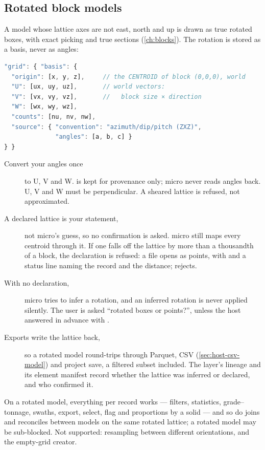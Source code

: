\subsection{Rotated block models}\label{sec:host-rotated}

A model whose lattice axes are not east, north and up is drawn as true rotated boxes, with exact
picking and true sections (\cref{ch:blocks}). The rotation is stored as a basis, never as angles:

\begin{lstlisting}[language=js]
"grid": { "basis": {
  "origin": [x, y, z],     // the CENTROID of block (0,0,0), world
  "U": [ux, uy, uz],       // world vectors:
  "V": [vx, vy, vz],       //   block size × direction
  "W": [wx, wy, wz],
  "counts": [nu, nv, nw],
  "source": { "convention": "azimuth/dip/pitch (ZXZ)",
              "angles": [a, b, c] }
} }
\end{lstlisting}

\begin{description}
\item[Convert your angles once] to U, V and W.  is kept for provenance only; micro
  never reads angles back. U, V and W must be perpendicular. A sheared lattice is refused, not
  approximated.
\item[A declared lattice is your statement,] not micro's guess, so no confirmation is asked. micro
  still maps every centroid through it. If one falls off the lattice by more than a thousandth of
  a block, the declaration is refused: a file opens as points, with
   and a status line naming the record and the distance;
   rejects.
\item[With no declaration,] micro tries to infer a rotation, and an inferred rotation is never
  applied silently. The user is asked “rotated boxes or points?”, unless the host answered in
  advance with .
\item[Exports write the lattice back,] so a rotated model round-trips through Parquet, CSV
  (\cref{sec:host-csv-model}) and project save, a filtered subset included. The layer's lineage
  and its element manifest record whether the lattice was inferred or declared, and who confirmed
  it.
\end{description}

\begin{note}
On a rotated model, everything per record works — filters, statistics, grade–tonnage, swaths,
export, select, flag and proportions by a solid — and so do joins and reconciles between models on
the same rotated lattice; a rotated model may be sub-blocked. Not supported: resampling between
different orientations, and the empty-grid creator.
\end{note}
